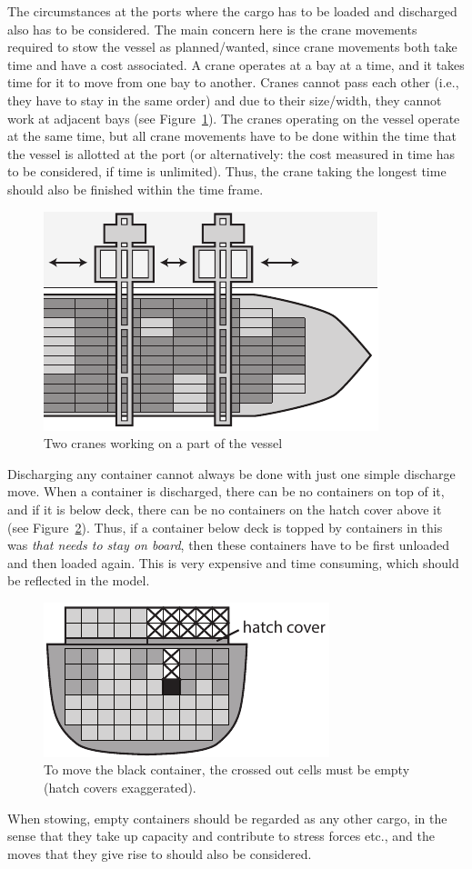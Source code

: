 The circumstances at the ports where the cargo has to be loaded and discharged also has to be considered. 
The main concern here is the crane movements required to stow the vessel as planned/wanted, since crane movements both take time and have a cost associated. 
A crane operates at a bay at a time, and it takes time for it to move from one bay to another. Cranes cannot pass each other (i.e., they have to stay in the same order) and due to their size/width, they cannot work at adjacent bays (see Figure~\ref{fig:cranes}). The cranes operating on the vessel operate at the same time, but all crane movements have to be done within the time that the vessel is allotted at the port (or alternatively: the cost measured in time has to be considered, if time is unlimited). Thus, the crane taking the longest time should also be finished within the time frame.

\begin{figure}
	\centering
		\includegraphics[scale=0.8]{figures/cranes.pdf}
	\caption{Two cranes working on a part of the vessel}
	\label{fig:cranes}
\end{figure}

Discharging any container cannot always be done with just one simple discharge move. When a container is discharged, there can be no containers on top of it, and if it is below deck, there can be no containers on the hatch cover above it (see Figure~\ref{fig:overstow}). Thus, if a container below deck is topped by containers in this was \emph{that needs to stay on board}, then these containers have to be first unloaded and then loaded again. This is very expensive and time consuming, which should be reflected in the model. 

\begin{figure}
	\centering
		\includegraphics[scale=0.9]{figures/overstow.pdf}
	\caption{To move the black container, the crossed out cells must be empty (hatch covers exaggerated).}
	\label{fig:overstow}
\end{figure}

When stowing, empty containers should be regarded as any other cargo, in the sense that they take up capacity and contribute to stress forces etc., and the moves that they give rise to should also be considered.    